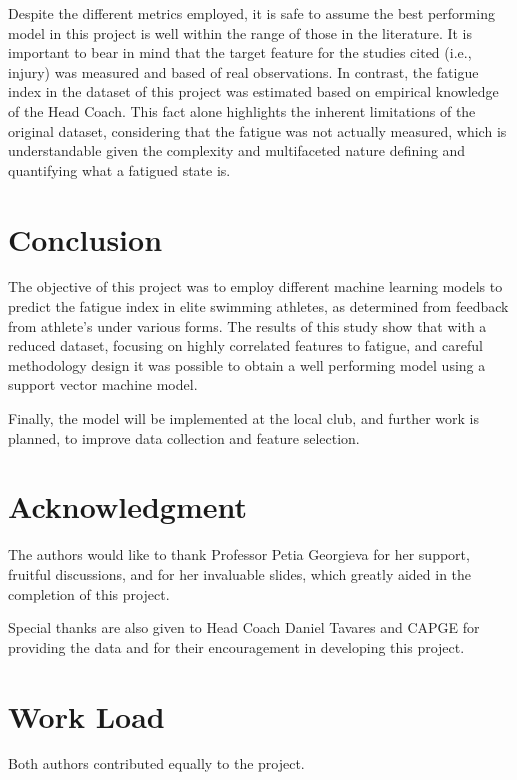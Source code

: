 \documentclass[conference]{IEEEtran}
\begin{document}
Despite the different metrics employed, it is safe to assume the best performing model in this project is well within the range of those in the literature. It is important to bear in mind that the target feature for the studies cited (i.e., injury) was measured and based of real observations. In contrast, the fatigue index in the dataset of this project was estimated based on empirical knowledge of the Head Coach. This fact alone highlights the inherent limitations of the original dataset, considering that the fatigue was not actually measured, which is understandable given the complexity and multifaceted nature defining and quantifying what a fatigued state is.

\section{Conclusion}

The objective of this project was to employ different machine learning models to predict the fatigue index in elite swimming athletes, as determined from feedback from athlete's under various forms. The results of this study show that with a reduced dataset, focusing on highly correlated features to fatigue, and careful methodology design it was possible to obtain a well performing model using a support vector machine model. 

Finally, the model will be implemented at the local club, and further work is planned, to improve data collection and feature selection.

\section*{Acknowledgment}

The authors would like to thank Professor Petia Georgieva for her support, fruitful discussions, and for her invaluable slides, which greatly aided in the completion of this project.

Special thanks are also given to Head Coach Daniel Tavares and CAPGE for providing the data and for their encouragement in developing this project.

\section*{Work Load}

Both authors contributed equally to the project.






\end{document}
